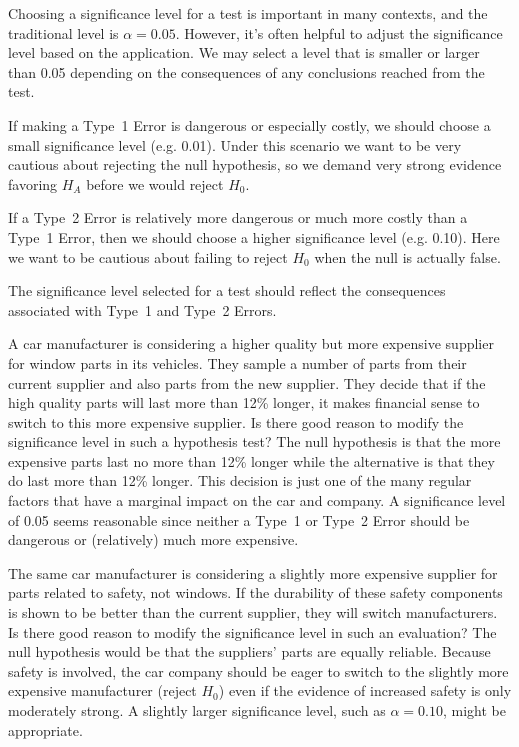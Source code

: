 Choosing a significance level for a test is important in
many contexts, and the traditional level is $\alpha = 0.05$.
However, it's often helpful to adjust the significance level
based on the application. We may select a level that is
smaller or larger than 0.05 depending on the consequences
of any conclusions reached from the test.

If making a Type~1 Error is dangerous or especially costly,
we should choose a small significance level (e.g. 0.01).
Under this scenario we want to be very cautious about
rejecting the null hypothesis, so we demand very strong
evidence favoring $H_A$ before we would reject $H_0$.

If a Type~2 Error is relatively more dangerous or much more
costly than a Type~1 Error, then we should choose a higher
significance level (e.g. 0.10). Here we want to be cautious
about failing to reject $H_0$ when the null is actually false.

\begin{tipBox}{
  The significance level selected for a test should reflect
  the consequences associated with Type~1 and Type~2 Errors.}
\end{tipBox}

\begin{example}{A car manufacturer is considering a higher
    quality but more expensive supplier for window parts in
    its vehicles. They sample a number of parts from their
    current supplier and also parts from the new supplier.
    They decide that if the high quality parts will last
    more than 12\% longer, it makes financial sense to
    switch to this more expensive supplier. Is there good
    reason to modify the significance level in such a
    hypothesis test?}
  The null hypothesis is that the more expensive parts last
  no more than 12\% longer while the alternative is that they
  do last more than 12\% longer. This decision is just one of
  the many regular factors that have a marginal impact on the
  car and company. A significance level of 0.05 seems
  reasonable since neither a Type~1 or Type~2 Error should
  be dangerous or (relatively) much more expensive.
\end{example}

\begin{example}{The same car manufacturer is considering
    a slightly more expensive supplier for parts related
    to safety, not windows. If the durability of these
    safety components is shown to be better than the
    current supplier, they will switch manufacturers.
    Is there good reason to modify the significance level
    in such an evaluation?}
  The null hypothesis would be that the suppliers' parts
  are equally reliable. Because safety is involved,
  the car company should be eager to switch to the slightly
  more expensive manufacturer (reject $H_0$) even if the
  evidence of increased safety is only moderately strong.
  A slightly larger significance level,
  such as $\alpha=0.10$, might be appropriate.
\end{example}

